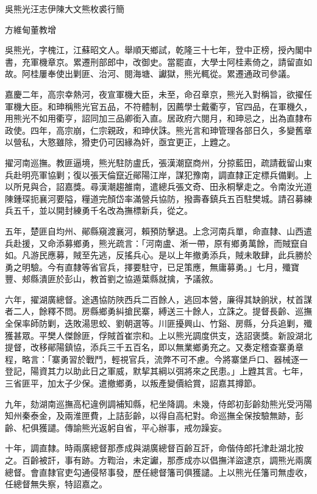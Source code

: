 
\begin{pinyinscope}
吳熊光汪志伊陳大文熊枚裘行簡

方維甸董教增

吳熊光，字槐江，江蘇昭文人。舉順天鄉試，乾隆三十七年，登中正榜，授內閣中書，充軍機章京。累遷刑部郎中，改御史。當罷直，大學士阿桂素倚之，請留直如故。阿桂屢奉使出剿匪、治河、閱海塘、讞獄，熊光輒從。累遷通政司參議。

嘉慶二年，高宗幸熱河，夜宣軍機大臣，未至，命召章京，熊光入對稱旨，欲擢任軍機大臣。和珅稱熊光官五品，不符體制，因薦學士戴衢亨，官四品，在軍機久，用熊光不如用衢亨，詔同加三品卿銜入直。居政府六閱月，和珅忌之，出為直隸布政使。四年，高宗崩，仁宗親政，和珅伏誅。熊光言和珅管理各部日久，多變舊章以營私，大憝雖除，猾吏仍可因緣為奸，亟宜更正，上韙之。

擢河南巡撫。教匪逼境，熊光駐防盧氏，張漢潮竄商州，分掠藍田，疏請截留山東兵赴明亮軍協剿；復以張天倫竄近鄖陽江岸，謀犯豫南，調直隸正定標兵備剿。上以所見與合，詔嘉獎。尋漢潮趨雒南，遣總兵張文奇、田永桐擊走之。令南汝光道陳鍾琛扼襄河要隘，糧道完顏岱率滿營兵協防，撥壽春鎮兵五百駐樊城。請召募練兵五千，並以開封練勇千名改為撫標新兵，從之。

五年，楚匪自均州、鄖縣窺渡襄河，賴預防擊退。上念河南兵單，命直隸、山西遣兵赴援，又命添募鄉勇，熊光疏言：「河南盧、淅一帶，原有鄉勇萬餘，而賊竄自如。凡游民應募，賊至先逃，反搖兵心。是以上年撤勇添兵，賊未敢肆，此兵勝於勇之明驗。今有直隸等省官兵，擇要駐守，已足策應，無庸募勇。」七月，殲寶豐、郟縣潰匪於彭山，教首劉之協遁葉縣就擒，予議敘。

六年，擢湖廣總督。途遇協防陜西兵二百餘人，逃回本營，廉得其缺餉狀，杖首謀者二人，餘釋不問。房縣鄉勇糾搶民寨，縛送三十餘人，立誅之。提督長齡、巡撫全保率師防剿，迭敗湯思蛟、劉朝選等。川匪擾興山、竹谿、房縣，分兵追剿，殲獲甚眾。平樊人傑餘匪，俘賊首崔宗和。上以熊光調度供支，迭詔褒獎。新設湖北提督，改移鄖陽鎮協，添兵三千五百名，即以無業鄉勇充之。又奏定稽查寨勇章程，略言：「寨勇習於戰鬥，輕視官兵，流弊不可不慮。今將寨堡戶口、器械逐一登記，陽資其力以助此日之軍威，默挈其綱以弭將來之民患。」上韙其言。七年，三省匪平，加太子少保。遣撤鄉勇，以叛產變價給賞，詔嘉其撙節。

九年，劾湖南巡撫高杞違例調補知縣，杞坐降調。未幾，侍郎初彭齡劾熊光受沔陽知州秦泰金，及兩淮匣費，上詰彭齡，以得自高杞對。命巡撫全保按驗無跡，彭齡、杞俱獲譴。傳諭熊光返躬自省，平心辦事，戒勿躁妄。

十年，調直隸。時兩廣總督那彥成與湖廣總督百齡互訐，命偕侍郎托津赴湖北按之。百齡被訐，事有跡。方鞫治，未定讞，那彥成亦以倡撫洋盜逮京，調熊光兩廣總督。會直隸官吏勾通侵帑事發，歷任總督籓司俱獲譴。上以熊光任籓司無虛收，任總督無失察，特詔嘉之。


\end{pinyinscope}
